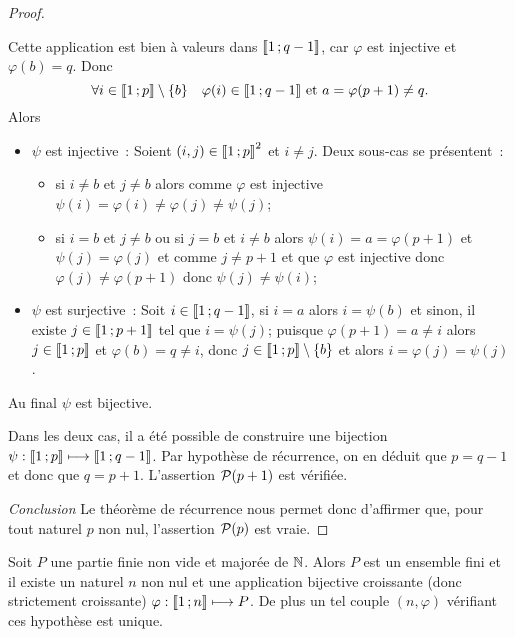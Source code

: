 \begin{proof}
\begin{itemize}
  Cette application est bien à valeurs dans $\intervalleentier{1}{q-1}$, car $\varphi$ est injective et $\varphi(b)=q$. Donc
  \begin{equation}
    \forall i \in \intervalleentier{1}{p} \setminus \{b\} \quad \varphi(i) \in \intervalleentier{1}{q-1} \text{~et~} a=\varphi(p+1) \neq q.
  \end{equation}
  Alors
  \begin{itemize}
  \item $\psi$ est injective~: Soient $(i,j) \in \intervalleentier{1}{p}^2$ et $i \neq j$. Deux sous-cas se présentent~:
    \begin{itemize}
    \item si $i \neq b$ et $j \neq b$ alors comme $\varphi$ est injective $\psi(i)=\varphi(i) \neq \varphi(j) \neq \psi(j)$;
    \item si $i = b$ et $j \neq b$ ou si $j=b$ et $i \neq b$ alors $\psi(i)=a=\varphi(p+1)$ et $\psi(j)=\varphi(j)$ et comme $j \neq p+1$ et que $\varphi$ est injective donc $\varphi(j) \neq \varphi(p+1)$ donc $\psi(j) \neq \psi(i)$;
    \end{itemize}
  \item $\psi$ est surjective~: Soit $i \in \intervalleentier{1}{q-1}$, si $i=a$ alors $i=\psi(b)$ et sinon, il existe $j \in \intervalleentier{1}{p+1}$ tel que $i=\psi(j)$; puisque $\varphi(p+1)=a \neq i$ alors $j \in \intervalleentier{1}{p}$ et $\varphi(b)=q \neq i$, donc $j \in \intervalleentier{1}{p} \setminus \{b\}$ et alors $i=\varphi(j)=\psi(j)$.
  \end{itemize}
  Au final $\psi$ est bijective.
\end{itemize}

Dans les deux cas, il a été possible de construire une bijection $\psi : \intervalleentier{1}{p} \longmapsto \intervalleentier{1}{q-1}$. Par hypothèse de récurrence, on en déduit que $p=q-1$ et donc que $q=p+1$. L'assertion $\P(p+1)$ est vérifiée.

\emph{Conclusion} Le théorème de récurrence nous permet donc d'affirmer que, pour tout naturel $p$ non nul, l'assertion $\P(p)$ est vraie.
\end{proof}

\begin{theo}
  Soit $P$ une partie finie non vide et majorée de $\N$. Alors $P$ est un ensemble fini et il existe un naturel $n$ non nul et une application bijective croissante (donc strictement croissante) $\varphi : \intervalleentier{1}{n} \longmapsto P$. De plus un tel couple $(n,  \varphi)$ vérifiant ces hypothèse est unique.
\end{theo}

